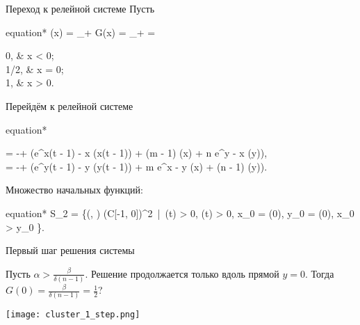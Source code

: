 \begin{frame}{Переход к релейной системе}
	Пусть 
	\begin{empheq}[box=\myeq]{equation*}
		(x) = \lim\limits_{\gamma \to +\infty} G(x) = \lim\limits_{\gamma \to +\infty}  = \begin{cases}
			0, & x < 0;\\
			1/2, & x = 0;\\
			1, & x > 0.
		\end{cases}
	\end{empheq}
	
	Перейдём к релейной системе
	\footnotesize
	\begin{empheq}[box=\myeq]{equation*}
		\begin{cases}
			 = -\beta + \alpha \left(e^{x(t - 1) - x} (x(t - 1)) + \delta (m - 1) (x) + \delta n e^{y - x} (y)\right),\\
			 = -\beta + \alpha \left(e^{y(t - 1) - y} (y(t - 1)) + \delta m e^{x - y} (x) + \delta (n - 1) (y)\right).
		\end{cases}
	\end{empheq}
	\normalsize
	
	Множество начальных функций:
	\footnotesize
	\begin{empheq}[box=\myeq]{equation*}
		S_2 = \{(\varphi, \psi) \in (C[-1, 0])^2 \,|\, \varphi(t) > 0, \psi(t) > 0, x_0 = \varphi(0), y_0 = \psi(0), x_0 > y_0 \}.
	\end{empheq}
	\normalsize
\end{frame}

\begin{frame}{Первый шаг решения системы}
	
	Пусть $\alpha > \frac{\beta}{\delta (n - 1)}$. Решение продолжается только вдоль прямой $y = 0$. Тогда $G(0) = \frac{\beta}{\delta(n - 1)} = \frac{1}{2}$?
	
	\begin{center}
		\texttt{[image: cluster\_1\_step.png]}
	\end{center}
\end{frame}

